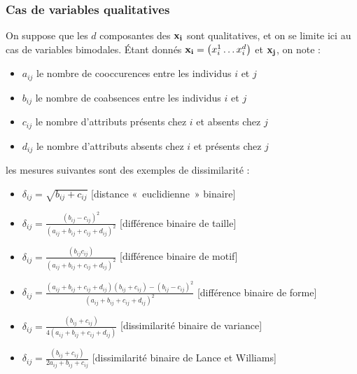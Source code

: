 \documentclass[letterpaper,10pt,french]{sphinxmanual}
\begin{document}
\subsubsection{Cas de variables qualitatives}
\label{\detokenize{clustering:cas-de-variables-qualitatives}}
\sphinxAtStartPar
On suppose que les \(d\) composantes des \({\bf x_i}\) sont qualitatives, et on se limite ici au cas de variables bimodales.
Étant donnés \({\bf x_i}=\begin{pmatrix} x_i^1\ldots x_i^d\end{pmatrix}\) et \({\bf x_j}\), on note :
\begin{itemize}
\item {} 
\sphinxAtStartPar
\(a_{ij}\) le nombre de co\sphinxhyphen{}occurences entre les individus \(i\) et \(j\)

\item {} 
\sphinxAtStartPar
\(b_{ij}\) le nombre de co\sphinxhyphen{}absences entre les individus \(i\) et \(j\)

\item {} 
\sphinxAtStartPar
\(c_{ij}\) le nombre d’attributs présents chez \(i\) et absents chez \(j\)

\item {} 
\sphinxAtStartPar
\(d_{ij}\) le nombre d’attributs absents chez \(i\) et présents chez \(j\)

\end{itemize}

\sphinxAtStartPar
les mesures suivantes sont des exemples de dissimilarité :
\begin{itemize}
\item {} 
\sphinxAtStartPar
\(\delta_{ij} = \sqrt{b_{ij}+c_{ij}}\) {[}distance « euclidienne » binaire{]}

\item {} 
\sphinxAtStartPar
\(\delta_{ij} = \frac{(b_{ij}-c_{ij})^2}{(a_{ij}+b_{ij}+c_{ij}+d_{ij})^2}\) {[}différence binaire de taille{]}

\item {} 
\sphinxAtStartPar
\(\delta_{ij} = \frac{(b_{ij}c_{ij})}{(a_{ij}+b_{ij}+c_{ij}+d_{ij})^2}\) {[}différence binaire de motif{]}

\item {} 
\sphinxAtStartPar
\(\delta_{ij} = \frac{(a_{ij}+b_{ij}+c_{ij}+d_{ij})(b_{ij}+c_{ij})-(b_{ij}-c_{ij})^2}{(a_{ij}+b_{ij}+c_{ij}+d_{ij})^2}\) {[}différence binaire de forme{]}

\item {} 
\sphinxAtStartPar
\(\delta_{ij} = \frac{(b_{ij}+c_{ij})}{4(a_{ij}+b_{ij}+c_{ij}+d_{ij})}\) {[}dissimilarité binaire de variance{]}

\item {} 
\sphinxAtStartPar
\(\delta_{ij} = \frac{(b_{ij}+c_{ij})}{2a_{ij}+b_{ij}+c_{ij}}\) {[}dissimilarité binaire de Lance et Williams{]}

\end{itemize}
\end{document}
